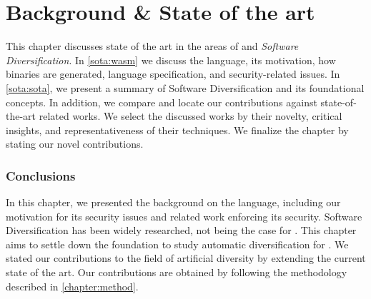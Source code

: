 \chapter{Background \& State of the art}

This chapter discusses state of the art in the areas of \emph{\wasm} and \emph{Software Diversification}. In \autoref{sota:wasm} we discuss the \wasm language, its motivation, how \wasm binaries are generated, language specification, and security-related issues. In \autoref{sota:sota}, we present a summary of Software Diversification and its foundational concepts. In addition, we compare and locate our contributions against state-of-the-art related works.  
We select the discussed works by their novelty, critical insights, and representativeness of their techniques. 
We finalize the chapter by stating our novel contributions. 







\subsection*{Conclusions}
In this chapter, we presented the background on the \wasm language, including our motivation for its security issues and related work enforcing its security.
Software Diversification has been widely researched, not being the case for \wasm. This chapter aims to settle down the foundation to study automatic diversification for \wasm. We stated our contributions to the field of artificial diversity by extending the current state of the art. 
Our contributions are obtained by following the methodology described in \autoref{chapter:method}.

